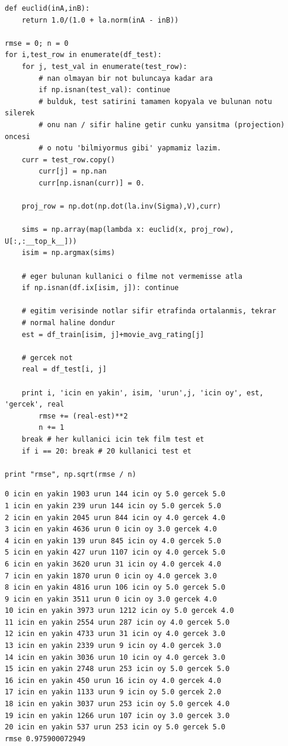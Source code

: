 \documentclass[12pt,fleqn]{article}\usepackage{../common}
\begin{document}
\begin{verbatim}
def euclid(inA,inB):
    return 1.0/(1.0 + la.norm(inA - inB))
    
rmse = 0; n = 0
for i,test_row in enumerate(df_test):
    for j, test_val in enumerate(test_row):
        # nan olmayan bir not buluncaya kadar ara
        if np.isnan(test_val): continue	
        # bulduk, test satirini tamamen kopyala ve bulunan notu silerek
        # onu nan / sifir haline getir cunku yansitma (projection) oncesi
        # o notu 'bilmiyormus gibi' yapmamiz lazim. 
	curr = test_row.copy()
        curr[j] = np.nan
        curr[np.isnan(curr)] = 0.

	proj_row = np.dot(np.dot(la.inv(Sigma),V),curr)

	sims = np.array(map(lambda x: euclid(x, proj_row), U[:,:__top_k__]))
	isim = np.argmax(sims)

	# eger bulunan kullanici o filme not vermemisse atla
	if np.isnan(df.ix[isim, j]): continue

	# egitim verisinde notlar sifir etrafinda ortalanmis, tekrar
	# normal haline dondur
	est = df_train[isim, j]+movie_avg_rating[j]

	# gercek not
	real = df_test[i, j]

	print i, 'icin en yakin', isim, 'urun',j, 'icin oy', est, 'gercek', real
        rmse += (real-est)**2
        n += 1
	break # her kullanici icin tek film test et
    if i == 20: break # 20 kullanici test et

print "rmse", np.sqrt(rmse / n)
\end{verbatim}

\begin{verbatim}
0 icin en yakin 1903 urun 144 icin oy 5.0 gercek 5.0
1 icin en yakin 239 urun 144 icin oy 5.0 gercek 5.0
2 icin en yakin 2045 urun 844 icin oy 4.0 gercek 4.0
3 icin en yakin 4636 urun 0 icin oy 3.0 gercek 4.0
4 icin en yakin 139 urun 845 icin oy 4.0 gercek 5.0
5 icin en yakin 427 urun 1107 icin oy 4.0 gercek 5.0
6 icin en yakin 3620 urun 31 icin oy 4.0 gercek 4.0
7 icin en yakin 1870 urun 0 icin oy 4.0 gercek 3.0
8 icin en yakin 4816 urun 106 icin oy 5.0 gercek 5.0
9 icin en yakin 3511 urun 0 icin oy 3.0 gercek 4.0
10 icin en yakin 3973 urun 1212 icin oy 5.0 gercek 4.0
11 icin en yakin 2554 urun 287 icin oy 4.0 gercek 5.0
12 icin en yakin 4733 urun 31 icin oy 4.0 gercek 3.0
13 icin en yakin 2339 urun 9 icin oy 4.0 gercek 3.0
14 icin en yakin 3036 urun 10 icin oy 4.0 gercek 3.0
15 icin en yakin 2748 urun 253 icin oy 5.0 gercek 5.0
16 icin en yakin 450 urun 16 icin oy 4.0 gercek 4.0
17 icin en yakin 1133 urun 9 icin oy 5.0 gercek 2.0
18 icin en yakin 3037 urun 253 icin oy 5.0 gercek 4.0
19 icin en yakin 1266 urun 107 icin oy 3.0 gercek 3.0
20 icin en yakin 537 urun 253 icin oy 5.0 gercek 5.0
rmse 0.975900072949
\end{verbatim}
\end{document}
